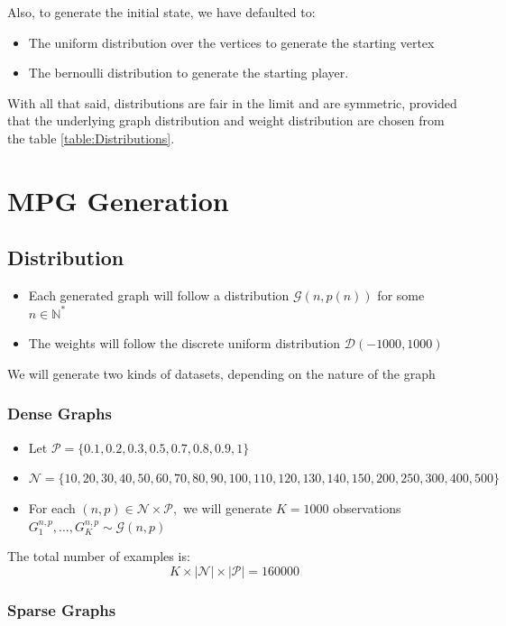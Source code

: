 \FloatBarrier
Also, to generate the initial state, we have defaulted to:
\begin{itemize}
	\item The uniform distribution over the vertices to generate the starting vertex
	\item The bernoulli distribution to generate the starting player.
\end{itemize}
With all that said, distributions are fair in the limit and are symmetric, provided that the underlying graph distribution and weight distribution are chosen from the table \ref{table:Distributions}.

\section{MPG Generation}
\label{section:MPG:Generation}
\subsection{Distribution}
\begin{itemize}
	\item Each generated graph will follow a distribution $\mathcal{G}(n,p(n))$  for some $n\in\mathbb{N}^*$
	\item The weights will follow the discrete uniform distribution $\mathcal{D}(-1000,1000)$

\end{itemize}

We will generate two kinds of datasets, depending on the nature of the graph

\subsubsection{Dense Graphs}
\begin{itemize}
	\item Let $\mathcal{P}=\{0.1,0.2,0.3,0.5,0.7,0.8,0.9,1\}$
	\item $\mathcal{N}=\{10,20,30,40,50,60,70,80,90,100,110,120,130,140,150,200,250,300,400,500\}$
	\item For each $(n,p)\in \mathcal{N}\times \mathcal{P},$ we will generate $K=1000$ observations $G^{n,p}_1,\dots,G^{n,p}_{K} \sim \mathcal{G}(n,p)$ 
\end{itemize} 

The total number of examples is:
$$
K\times\lvert \mathcal{N} \rvert \times \lvert \mathcal{P}\rvert=160000
$$
\subsubsection{Sparse Graphs}
